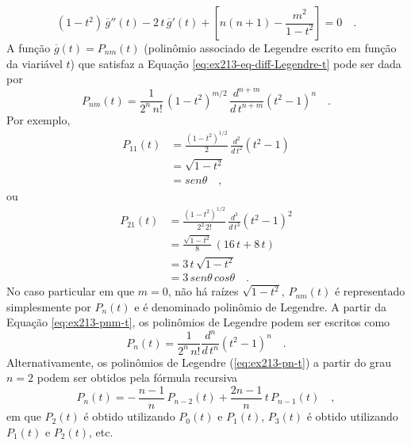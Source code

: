 \documentclass[10pt,a4paper,fleqn]{article}
\begin{document}
\begin{equation}
(1 - t^2) \, \overline{g}''(t) - 2 \, t \, \overline{g}'(t) +
\left[ n(n+1) - \frac{m^{2}}{1 - t^2} \right] = 0 \quad .
\label{eq:ex213-eq-diff-Legendre-t}
\end{equation}
A funç\~{a}o $\overline{g}(t) = P_{nm}(t)$ (polin\^{o}mio associado de Legendre escrito em funç\~{a}o da viari\'{a}vel 
$t$) que satisfaz a Equaç\~{a}o \ref{eq:ex213-eq-diff-Legendre-t} pode ser dada por
\begin{equation}
P_{nm}(t) = \frac{1}{2^{n} \, n!} \, (1 - t^{2})^{m/2} \,
\frac{d^{n+m}}{d \, t^{n+m}}(t^{2} - 1)^{n} \quad .
\label{eq:ex213-pnm-t}
\end{equation}
Por exemplo,
\begin{equation}
\begin{split}
P_{11}(t) & = \frac{(1 - t^{2})^{1/2}}{2} \, \frac{d^{2}}{d \, t^{2}}(t^{2} - 1) \\
& = \sqrt{1 - t^{2}} \\
& = sen \theta \quad ,
\end{split}
\label{eq:ex213-p11-t}
\end{equation}
ou
\begin{equation}
\begin{split}
P_{21}(t) & = \frac{(1 - t^{2})^{1/2}}{2^{2} \, 2!} \, \frac{d^{3}}{d \, t^{3}}(t^{2} - 1)^{2} \\
& = \frac{\sqrt{1 - t^{2}}}{8} \, (16 \, t + 8 \, t) \\
& = 3 \, t \, \sqrt{1 - t^{2}} \\
& = 3 \, sen \theta \, cos \theta \quad .
\end{split}
\label{eq:ex213-p21-t}
\end{equation}
No caso particular em que $m = 0$, n\~{a}o h\'{a} ra\'{i}zes $\sqrt{1 - t^{2}}$, $P_{nm}(t)$ \'{e} representado 
simplesmente por $P_{n}(t)$ e \'{e} denominado polin\^{o}mio de Legendre. A partir da Equação \ref{eq:ex213-pnm-t}, 
os polin\^{o}mios de Legendre podem ser escritos como
\begin{equation}
P_{n}(t) = \frac{1}{2^{n} \, n!} \frac{d^{n}}{d \, t^{n}}(t^{2} - 1)^{n} \quad .
\label{eq:ex213-pn-t}
\end{equation}
Alternativamente, os polin\^{o}mios de Legendre (\ref{eq:ex213-pn-t}) a partir do grau $n = 2$ podem ser obtidos pela 
f\'{o}rmula recursiva
\begin{equation}
P_{n}(t) = - \, \frac{n - 1}{n} \, P_{n-2}(t) + \frac{2n - 1}{n} \, t \, P_{n-1}(t) \quad ,
\label{eq:ex213-pn-recursiva}
\end{equation}
em que $P_{2}(t)$ \'{e} obtido utilizando $P_{0}(t)$ e $P_{1}(t)$, $P_{3}(t)$ \'{e} obtido utilizando $P_{1}(t)$ e $P_{2}(t)$, etc.
\end{document}
